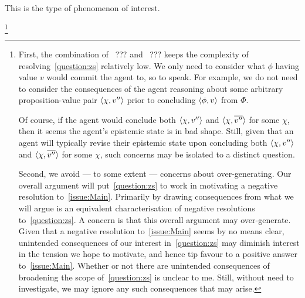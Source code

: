 \begin{note}
  This is the type of phenomenon of interest.

  \footnote{
    First, the combination of~{\color{red} ???} and~{\color{red} ???} keeps the complexity of resolving~\autoref{question:zs} relatively low.
  We only need to consider what \(\phi\) having value \(v\) would commit the agent to, so to speak.
  For example, we do not need to consider the consequences of the agent reasoning about some arbitrary proposition-value pair \(\langle \chi, v'' \rangle\) prior to concluding \(\langle \phi, v \rangle\) from \(\Phi\).

  Of course, if the agent would conclude both \(\langle \chi, v'' \rangle\) and \(\langle \chi, \overline{v''} \rangle\) for some \(\chi\), then it seems the agent's epistemic state is in bad shape.
  Still, given that an agent will typically revise their epistemic state upon concluding both \(\langle \chi, v'' \rangle\) and \(\langle \chi, \overline{v''} \rangle\) for some \(\chi\), such concerns may be isolated to a distinct question.

  Second, we avoid --- to some extent --- concerns about over-generating.
  Our overall argument will put~\autoref{question:zs} to work in motivating a negative resolution to~\autoref{issue:Main}.
  Primarily by drawing consequences from what we will argue is an equivalent characterisation of negative resolutions to~\autoref{question:zs}.
  A concern is that this overall argument may over-generate.
  Given that a negative resolution to~\autoref{issue:Main} seems by no means clear, unintended consequences of our interest in~\autoref{question:zs} may diminish interest in the tension we hope to motivate, and hence tip favour to a positive answer to~\autoref{issue:Main}.
  Whether or not there are unintended consequences of broadening the scope of~\autoref{question:zs} is unclear to me.
  Still, without need to investigate, we may ignore any such consequences that may arise.
  }
\end{note}


